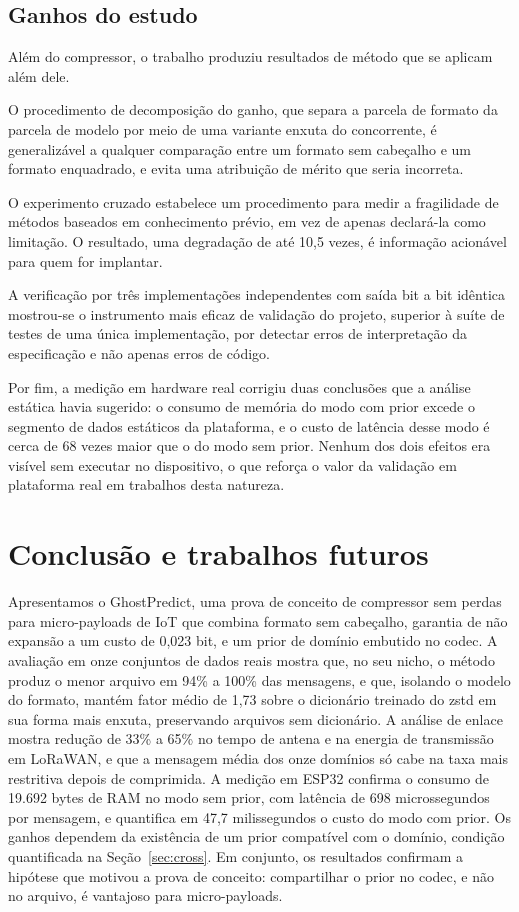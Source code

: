 \documentclass[12pt]{article}
\begin{document}
\subsection{Ganhos do estudo}

Além do compressor, o trabalho produziu resultados de método que se aplicam além
dele.

O procedimento de decomposição do ganho, que separa a parcela de formato da
parcela de modelo por meio de uma variante enxuta do concorrente, é
generalizável a qualquer comparação entre um formato sem cabeçalho e um formato
enquadrado, e evita uma atribuição de mérito que seria incorreta.

O experimento cruzado estabelece um procedimento para medir a fragilidade de
métodos baseados em conhecimento prévio, em vez de apenas declará-la como
limitação. O resultado, uma degradação de até 10,5 vezes, é informação
acionável para quem for implantar.

A verificação por três implementações independentes com saída bit a bit idêntica
mostrou-se o instrumento mais eficaz de validação do projeto, superior à suíte
de testes de uma única implementação, por detectar erros de interpretação da
especificação e não apenas erros de código.

Por fim, a medição em hardware real corrigiu duas conclusões que a análise
estática havia sugerido: o consumo de memória do modo com prior excede o
segmento de dados estáticos da plataforma, e o custo de latência desse modo é
cerca de 68 vezes maior que o do modo sem prior. Nenhum dos dois efeitos
era visível sem executar no dispositivo, o que reforça o valor da validação em
plataforma real em trabalhos desta natureza.

\section{Conclusão e trabalhos futuros}

Apresentamos o GhostPredict, uma prova de conceito de compressor sem perdas para
micro-payloads de IoT que combina formato sem cabeçalho, garantia de não expansão a um custo de 0,023
bit, e um prior de domínio embutido no codec. A avaliação em onze conjuntos de
dados reais mostra que, no seu nicho, o método produz o menor arquivo em 94\% a
100\% das mensagens, e que, isolando o modelo do formato, mantém fator médio de
1,73 sobre o dicionário treinado do zstd em sua forma mais enxuta, preservando
arquivos sem dicionário. A análise de enlace mostra redução de 33\% a 65\% no
tempo de antena e na energia de transmissão em LoRaWAN, e que a mensagem média
dos onze domínios só cabe na taxa mais restritiva depois de comprimida. A
medição em ESP32 confirma o consumo de 19.692 bytes de RAM no modo sem prior,
com latência de 698 microssegundos por mensagem, e quantifica em 47,7
milissegundos o custo do modo com prior. Os ganhos dependem da existência de um
prior compatível com o domínio, condição quantificada na
Seção~\ref{sec:cross}. Em conjunto, os resultados confirmam a hipótese que
motivou a prova de conceito: compartilhar o prior no codec, e não no arquivo, é
vantajoso para micro-payloads.
\end{document}
